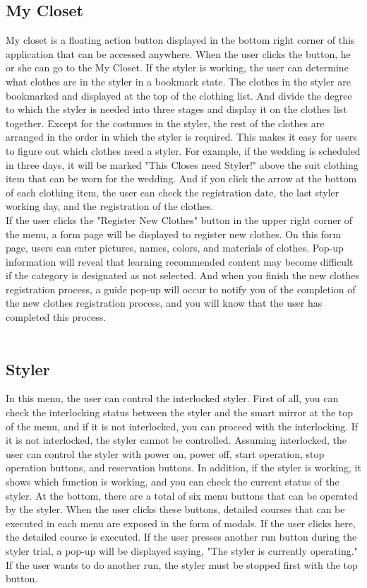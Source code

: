 \documentclass[conference]{IEEEtran}
\begin{document}
\subsection{My Closet}
My closet is a floating action button displayed in the bottom right corner of this application that can be accessed anywhere. When the user clicks the button, he or she can go to the My Closet. If the styler is working, the user can determine what clothes are in the styler in a bookmark state. The clothes in the styler are bookmarked and displayed at the top of the clothing list. And divide the degree to which the styler is needed into three stages and display it on the clothes list together. Except for the costumes in the styler, the rest of the clothes are arranged in the order in which the styler is required. This makes it easy for users to figure out which clothes need a styler. For example, if the wedding is scheduled in three days, it will be marked "This Closes need Styler!" above the suit clothing item that can be worn for the wedding. And if you click the arrow at the bottom of each clothing item, the user can check the registration date, the last styler working day, and the registration of the clothes.\\
If the user clicks the "Register New Clothes" button in the upper right corner of the menu, a form page will be displayed to register new clothes. On this form page, users can enter pictures, names, colors, and materials of clothes. Pop-up information will reveal that learning recommended content may become difficult if the category is designated as not selected. And when you finish the new clothes registration process, a guide pop-up will occur to notify you of the completion of the new clothes registration process, and you will know that the user has completed this process.\\ \\

\subsection{Styler}
In this menu, the user can control the interlocked styler. First of all, you can check the interlocking status between the styler and the smart mirror at the top of the menu, and if it is not interlocked, you can proceed with the interlocking. If it is not interlocked, the styler cannot be controlled. Assuming interlocked, the user can control the styler with power on, power off, start operation, stop operation buttons, and reservation buttons. In addition, if the styler is working, it shows which function is working, and you can check the current status of the styler. At the bottom, there are a total of six menu buttons that can be operated by the styler. When the user clicks these buttons, detailed courses that can be executed in each menu are exposed in the form of modals. If the user clicks here, the detailed course is executed. If the user presses another run button during the styler trial, a pop-up will be displayed saying, "The styler is currently operating." If the user wants to do another run, the styler must be stopped first with the top button. \\ \\
\end{document}
